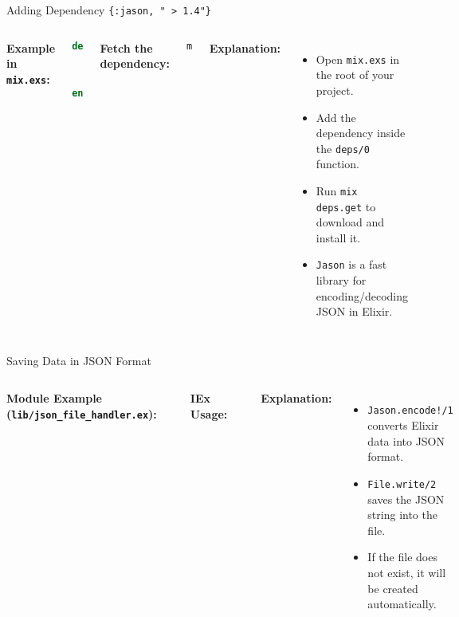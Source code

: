 \documentclass[aspectratio=169, table]{beamer}
\begin{document}
\begin{frame}[fragile]{Adding Dependency \texttt{\{:jason, "~> 1.4"\}}}
\vspace{20pt}
\begin{columns}[t]

\textbf{Example in \texttt{mix.exs}:}
\begin{lstlisting}[language=Elixir]
defp deps do
  [
    {:jason, "~> 1.4"}
  ]
end
\end{lstlisting}

\textbf{Fetch the dependency:}
\begin{lstlisting}[language=bash]
mix deps.get
\end{lstlisting}

\textbf{Explanation:}
\begin{itemize}
  \item Open \texttt{mix.exs} in the root of your project.
  \item Add the dependency inside the \texttt{deps/0} function.
  \item Run \texttt{mix deps.get} to download and install it.
  \item \texttt{Jason} is a fast library for encoding/decoding JSON in Elixir.
\end{itemize}

\end{columns}
\end{frame}


\begin{frame}[fragile]{Saving Data in JSON Format}
\vspace{20pt}
\begin{columns}[t]

\textbf{Module Example (\texttt{lib/json\_file\_handler.ex}):}
\begin{lstlisting}[language=Elixir, basicstyle=\ttfamily\scriptsize]
defmodule Json_File_Handler do
  # Save data to a JSON file
  def save_json(filename, data) do
    File.write(filename, Jason.encode!(data))
  end
end
\end{lstlisting}

\textbf{IEx Usage:}
\begin{lstlisting}[language=Elixir, basicstyle=\ttfamily\scriptsize]
filename = "data.json"
data = %{"greeting" => "Hello, Elixir!", "count" => 42}
Json_File_Handler.save_json(filename, data)
\end{lstlisting}

\textbf{Explanation:}
\begin{itemize}
  \item \texttt{Jason.encode!/1} converts Elixir data into JSON format.
  \item \texttt{File.write/2} saves the JSON string into the file.
  \item If the file does not exist, it will be created automatically.
\end{itemize}

\end{columns}
\end{frame}
\end{document}
